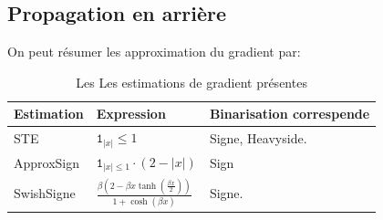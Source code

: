 \newpage 
\subsection{Propagation en arrière}
On peut résumer les approximation du gradient par:
\begin{table}[h]
	\small
	\begin{tabularx}{\textwidth}{| p{3cm} | p{3cm} | X |}
		\hline
		
		Estimation & Expression & Binarisation correspende  \\
		\hline 
		STE & $\mathtt{1}_{\lvert x  \rvert} \le 1 $ &  Signe, Heavyside. \\
		\hline  
		ApproxSign & $\mathtt{1}_{\lvert x  \rvert \le 1}  \cdot (2-\lvert x \rvert) $ &  Sign\\
		\hline
		SwishSigne & $\frac{\beta \left(2-\beta x \tanh(\frac{\beta x }{2})\right)}{1+\cosh(\beta x)}$ &  Signe. \\
		\hline 
	\end{tabularx}
	\caption{Les Les estimations de gradient présentes}
\end{table}
